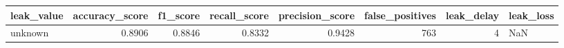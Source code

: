 \begin{tabular}{lrrrrrrl}
\toprule
leak\_value & accuracy\_score & f1\_score & recall\_score & precision\_score & false\_positives & leak\_delay & leak\_loss \\
\midrule
unknown & 0.8906 & 0.8846 & 0.8332 & 0.9428 & 763 & 4 & NaN \\
\bottomrule
\end{tabular}

